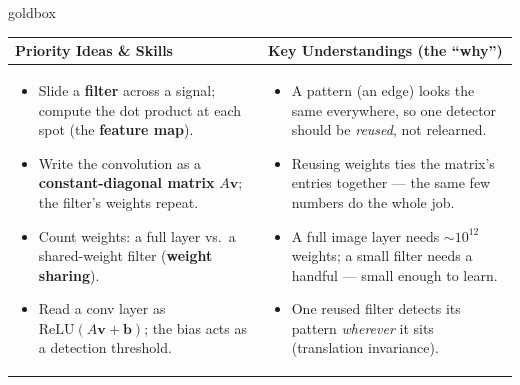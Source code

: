 \documentclass[10pt]{article}
\newcommand{\vv}{\mathbf{v}}
\newcommand{\bb}{\mathbf{b}}
\newcommand{\relu}{\mathrm{ReLU}}
\begin{document}
\renewcommand{\arraystretch}{1.4}
\begin{skillbox}{goldbox}
\begin{tabularx}{\linewidth}{@{}X|X@{}}
\textbf{Priority Ideas \& Skills} & \textbf{Key Understandings (the ``why'')} \\[2pt]
\hline
\vspace{-6pt}
\begin{itemize}[leftmargin=1.1em, nosep, after=\vspace{2pt}]
  \item Slide a \textbf{filter} across a signal; compute the dot product at each spot (the \textbf{feature map}).
  \item Write the convolution as a \textbf{constant-diagonal matrix} $A\vv$; the filter's weights repeat.
  \item Count weights: a full layer vs.\ a shared-weight filter (\textbf{weight sharing}).
  \item Read a conv layer as $\relu(A\vv+\bb)$; the bias acts as a detection threshold.
\end{itemize}
&
\vspace{-6pt}
\begin{itemize}[leftmargin=1.1em, nosep, after=\vspace{2pt}]
  \item A pattern (an edge) looks the same everywhere, so one detector should be \emph{reused}, not relearned.
  \item Reusing weights ties the matrix's entries together --- the same few numbers do the whole job.
  \item A full image layer needs $\sim\!10^{12}$ weights; a small filter needs a handful --- small enough to learn.
  \item One reused filter detects its pattern \emph{wherever} it sits (translation invariance).
\end{itemize}
\end{tabularx}
\end{skillbox}
\end{document}
